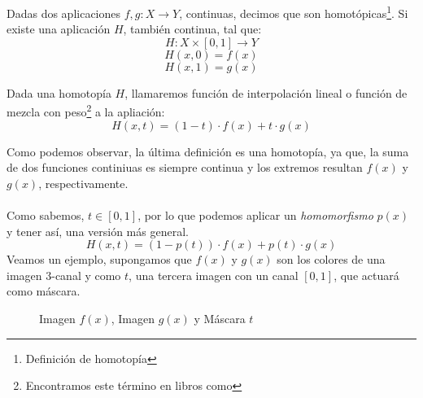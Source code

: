 \begin{definition}
    Dadas dos aplicaciones \(f, g:X\longrightarrow Y\), continuas, decimos que son homotópicas\footnote{Definición de homotopía}. Si existe una aplicación \(H\), también continua, tal que:
    \[ H:X\times[0,1]\longrightarrow Y \]
    \[ H(x, 0)=f(x) \]
    \[ H(x, 1)=g(x) \]
\end{definition}
\begin{definition}
    Dada una homotopía \(H\), llamaremos función de interpolación lineal o función de mezcla con peso\footnote{Encontramos este término en libros como} a la apliación:
    \[H(x, t)=(1-t)\cdot f(x) + t\cdot g(x)\]
\end{definition}
Como podemos observar,  la última definición es una homotopía, ya que, la suma de dos funciones continiuas es siempre continua y los extremos resultan \(f(x)\) y \(g(x)\), respectivamente.\\\\
Como sabemos, \(t\in[0,1]\), por lo que podemos aplicar un \textit{homomorfismo} \(p(x)\) y tener así, una versión más general.
    \[H(x, t)=(1-p(t))\cdot f(x) + p(t)\cdot g(x)\]
Veamos un ejemplo, supongamos que \(f(x)\) y \(g(x)\) son los colores de una imagen 3-canal y como \(t\), una tercera imagen con un canal \([0,1]\), que actuará como máscara.
\begin{figure}[H]
  \centering
  \captionsetup{justification=centering}%
  \caption{Imagen \(f(x)\), Imagen \(g(x)\) y Máscara \(t\)}
\end{figure}
